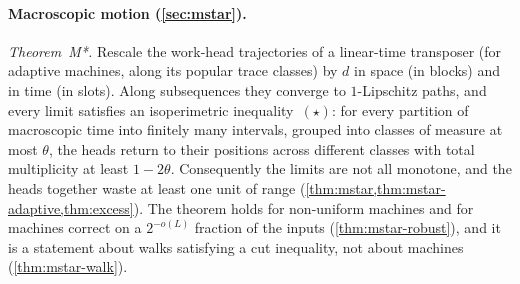 \paragraph{Macroscopic motion (\cref{sec:mstar}).} \emph{Theorem~M*.} Rescale the work-head trajectories of a
linear-time transposer (for adaptive machines, along its popular trace classes) by $d$ in space (in blocks) and in
time (in slots). Along subsequences they converge to
$1$-Lipschitz paths, and every limit satisfies an isoperimetric inequality~$(\star)$: for every partition of macroscopic time into finitely many intervals, grouped into classes of measure at most $\theta$, the heads return to their positions across different classes with total multiplicity at least $1-2\theta$. Consequently the limits are not all monotone, and the heads
together waste at least one unit of range (\cref{thm:mstar,thm:mstar-adaptive,thm:excess}). The theorem holds for
non-uniform machines and for machines correct on a $2^{-o(L)}$ fraction of the inputs (\cref{thm:mstar-robust}), and
it is a statement about walks satisfying a cut inequality, not about machines (\cref{thm:mstar-walk}).

